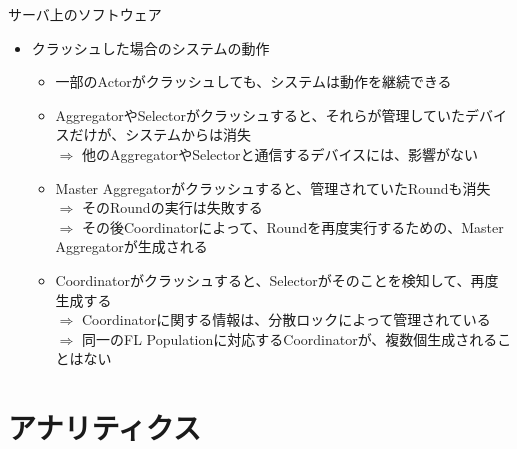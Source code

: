 \documentclass[dvipdfmx,notheorems,t]{beamer}
\begin{document}
\begin{frame}{サーバ上のソフトウェア}

\begin{itemize}
	\item クラッシュした場合のシステムの動作
	\begin{itemize}
		\item 一部のActorがクラッシュしても、システムは動作を継続できる
		\newline
		
		\item AggregatorやSelectorがクラッシュすると、それらが管理していたデバイスだけが、システムからは消失 \\
		$\Rightarrow$ 他のAggregatorやSelectorと通信するデバイスには、影響がない
		\newline
		
		\item Master Aggregatorがクラッシュすると、管理されていたRoundも消失 \\
		$\Rightarrow$ そのRoundの実行は失敗する \\
		$\Rightarrow$ その後Coordinatorによって、Roundを再度実行するための、Master Aggregatorが生成される
		\newline
		
		\item Coordinatorがクラッシュすると、Selectorがそのことを検知して、再度生成する \\
		$\Rightarrow$ Coordinatorに関する情報は、分散ロックによって管理されている \\
		$\Rightarrow$ 同一のFL Populationに対応するCoordinatorが、複数個生成されることはない
	\end{itemize}
\end{itemize}

\end{frame}

\section{アナリティクス}
\end{document}
